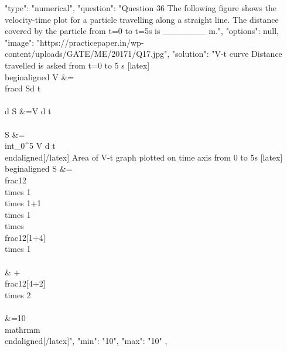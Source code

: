   {
    "type": "numerical",
    "question": "Question 36 The following figure shows the velocity-time plot for a particle travelling along a straight line. The distance covered by the particle from t=0 to t=5s is _______ m.",
    "options": null,
    "image": "https://practicepaper.in/wp-content/uploads/GATE/ME/20171/Q17.jpg",
    "solution": "V-t curve Distance travelled is asked from t=0 to 5 s [latex] \\begin{aligned} V &=\\frac{d S}{d t} \\\\ d S &=V d t \\\\ S &=\\int_{0}^{5} V d t \\end{aligned}[/latex] Area of V-t graph plotted on time axis from 0 to 5s [latex] \\begin{aligned} S &=\\frac{1}{2} \\times 1 \\times 1+1 \\times 1 \\times \\frac{1}{2}[1+4] \\times 1 \\\\ & +\\frac{1}{2}[4+2] \\times 2 \\\\ &=10 \\mathrm{m} \\end{aligned}[/latex]",
    "min": "10",
    "max": "10"
  },
